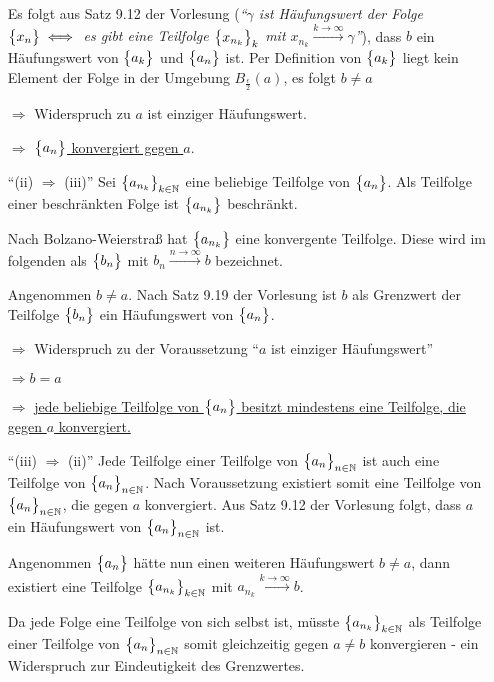 \documentclass{scrreprt}
\begin{document}
\begin{itemize}
  Es folgt aus Satz 9.12 der Vorlesung (\emph{``$\gamma$ ist Häufungswert der
    Folge $\qty\big{x_n} \iff$ es gibt eine Teilfolge $\qty\big{x_{n_k}}_k$ mit
    $x_{n_k} \overset{k \to \infty}\longrightarrow \gamma$''}), dass
  $b$ ein Häufungswert von $\qty\big{a_k}$ und $\qty\big{a_n}$ ist.
  Per Definition von $\qty\big{a_k}$ liegt kein Element der Folge in
  der Umgebung $B_{\frac{\epsilon}{2}}(a)$, es folgt $b \ne a$

  $\Rightarrow$ Widerspruch zu $a$ ist einziger Häufungswert.

  $\Rightarrow$ \underline{$\qty\big{a_n}$ konvergiert gegen $a$}.

\item[``(ii) $\Rightarrow$ (iii)''] Sei $\qty\big{a_{n_k}}_{k \in \mathbb{N}}$
  eine beliebige Teilfolge von $\qty\big{a_n}$.
  Als Teilfolge einer beschränkten Folge ist $\qty\big{a_{n_k}}$ beschränkt.

  Nach Bolzano-Weierstraß hat $\qty\big{a_{n_k}}$ eine konvergente Teilfolge.
  Diese wird im folgenden als $\qty\big{b_n}$ mit
  $b_n \overset{n \to \infty}\longrightarrow b$ bezeichnet.

  Angenommen $b \ne a$.
  Nach Satz 9.19 der Vorlesung ist $b$ als Grenzwert der Teilfolge
  $\qty\big{b_n}$ ein Häufungswert von $\qty\big{a_n}$.

  $\Rightarrow$ Widerspruch zu der Voraussetzung ``$a$ ist einziger
  Häufungswert''

  $\Rightarrow b = a$

  $\Rightarrow$ \underline{jede beliebige Teilfolge von $\qty\big{a_n}$ besitzt
    mindestens eine Teilfolge, die gegen $a$ konvergiert.}

\item[``(iii) $\Rightarrow$ (ii)''] Jede Teilfolge einer Teilfolge von
  $\qty\big{a_n}_{n \in \mathbb{N}}$ ist auch eine Teilfolge von
  $\qty\big{a_n}_{n \in \mathbb{N}}$.
  Nach Voraussetzung existiert somit eine Teilfolge von
  $\qty\big{a_n}_{n \in \mathbb{N}}$, die gegen $a$ konvergiert.
  Aus Satz 9.12 der Vorlesung folgt, dass $a$ ein Häufungswert von
  $\qty\big{a_n}_{n \in \mathbb{N}}$ ist.

  Angenommen $\qty\big{a_n}$ hätte nun einen weiteren Häufungswert $b \ne a$,
  dann existiert eine Teilfolge $\qty\big{a_{n_k}}_{k \in \mathbb{N}}$ mit
  $a_{n_k} \overset{k \to \infty}\longrightarrow b$.

  Da jede Folge eine Teilfolge von sich selbst ist, müsste
  $\qty\big{a_{n_k}}_{k \in \mathbb{N}}$ als Teilfolge einer Teilfolge
  von $\qty\big{a_n}_{n \in \mathbb{N}}$ somit gleichzeitig gegen
  $a \ne b$ konvergieren - ein Widerspruch zur Eindeutigkeit des
  Grenzwertes.


\end{itemize}
\end{document}

